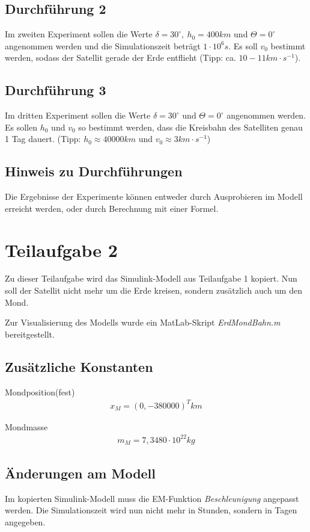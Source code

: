 \documentclass[]{scrartcl}
\begin{document}
\subsection{Durchführung 2}
Im zweiten Experiment sollen die Werte $\delta = 30^\circ,\ h_{0} = 400km$ und $\Theta=0^\circ$ angenommen werden und die Simulationszeit beträgt $1 \cdot 10^6s$. Es soll $v_{0}$ bestimmt werden, sodass der Satellit gerade der Erde entflieht (Tipp: ca. $10 - 11 km \cdot s^{-1}$).

\subsection{Durchführung 3}
Im dritten Experiment sollen die Werte $\delta = 30^\circ$ und $\Theta = 0^\circ$ angenommen werden. Es sollen $h_{0}$ und $v_{0}$ so bestimmt werden, dass die Kreisbahn des Satelliten genau 1 Tag dauert. (Tipp: $h_{0} \approx 40000 km$ und $v_{0} \approx 3 km \cdot s^{-1}$)

\subsection{Hinweis zu Durchführungen}
Die Ergebnisse der Experimente können entweder durch Ausprobieren im Modell erreicht werden, oder durch Berechnung mit einer Formel.

\section{Teilaufgabe 2}
Zu dieser Teilaufgabe wird das Simulink-Modell aus Teilaufgabe 1 kopiert. Nun soll der Satellit nicht mehr um die Erde kreisen, sondern zusätzlich auch um den Mond.

Zur Visualisierung des Modells wurde ein MatLab-Skript \textit{ErdMondBahn.m} bereitgestellt.

\subsection{Zusätzliche Konstanten}
Mondposition(fest)
\begin{align}
x_{M} = (0,-380000)^T km
\end{align}

Mondmasse
\begin{align}
m_{M} = 7,3480 \cdot 10^{22} kg
\end{align}

\subsection{Änderungen am Modell}
Im kopierten Simulink-Modell muss die EM-Funktion \textit{Beschleunigung} angepasst werden. %
Die Simulationszeit wird nun nicht mehr in Stunden, sondern in Tagen angegeben.
\end{document}

